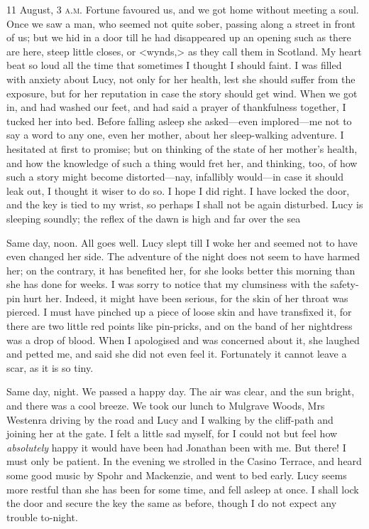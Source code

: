 \begin{diary}{11 August, 3 \textsc{a.m.}}
Fortune favoured us, and we got home without meeting a soul. Once we saw a man, who seemed not quite sober, passing along a street in front of us; but we hid in a door till he had disappeared up an opening such as there are here, steep little closes, or <wynds,> as they call them in Scotland. My heart beat so loud all the time that sometimes I thought I should faint. I was filled with anxiety about Lucy, not only for her health, lest she should suffer from the exposure, but for her reputation in case the story should get wind. When we got in, and had washed our feet, and had said a prayer of thankfulness together, I tucked her into bed. Before falling asleep she asked—even implored—me not to say a word to any one, even her mother, about her sleep-walking adventure. I hesitated at first to promise; but on thinking of the state of her mother's health, and how the knowledge of such a thing would fret her, and thinking, too, of how such a story might become distorted—nay, infallibly would—in case it should leak out, I thought it wiser to do so. I hope I did right. I have locked the door, and the key is tied to my wrist, so perhaps I shall not be again disturbed. Lucy is sleeping soundly; the reflex of the dawn is high and far over the sea
\end{diary}
 

\begin{diary}{Same day, noon.}
All goes well. Lucy slept till I woke her and seemed not to have even changed her side. The adventure of the night does not seem to have harmed her; on the contrary, it has benefited her, for she looks better this morning than she has done for weeks. I was sorry to notice that my clumsiness with the safety-pin hurt her. Indeed, it might have been serious, for the skin of her throat was pierced. I must have pinched up a piece of loose skin and have transfixed it, for there are two little red points like pin-pricks, and on the band of her nightdress was a drop of blood. When I apologised and was concerned about it, she laughed and petted me, and said she did not even feel it. Fortunately it cannot leave a scar, as it is so tiny.
\end{diary}
 

\begin{diary}{Same day, night.}
We passed a happy day. The air was clear, and the sun bright, and there was a cool breeze. We took our lunch to Mulgrave Woods, Mrs Westenra driving by the road and Lucy and I walking by the cliff-path and joining her at the gate. I felt a little sad myself, for I could not but feel how \textit{absolutely} happy it would have been had Jonathan been with me. But there! I must only be patient. In the evening we strolled in the Casino Terrace, and heard some good music by Spohr and Mackenzie, and went to bed early. Lucy seems more restful than she has been for some time, and fell asleep at once. I shall lock the door and secure the key the same as before, though I do not expect any trouble to-night.
\end{diary}
 

